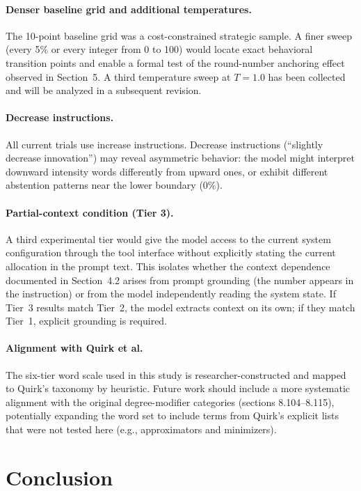 \documentclass[11pt]{article}
\begin{document}
\paragraph{Denser baseline grid and additional temperatures.}
The 10-point baseline grid was a cost-constrained strategic sample. A finer sweep (every 5\% or every integer from 0 to 100) would locate exact behavioral transition points and enable a formal test of the round-number anchoring effect observed in Section~5. A third temperature sweep at $T{=}1.0$ has been collected and will be analyzed in a subsequent revision.

\paragraph{Decrease instructions.}
All current trials use increase instructions. Decrease instructions (``slightly decrease innovation'') may reveal asymmetric behavior: the model might interpret downward intensity words differently from upward ones, or exhibit different abstention patterns near the lower boundary (0\%).

\paragraph{Partial-context condition (Tier 3).}
A third experimental tier would give the model access to the current system configuration through the tool interface without explicitly stating the current allocation in the prompt text. This isolates whether the context dependence documented in Section~4.2 arises from prompt grounding (the number appears in the instruction) or from the model independently reading the system state. If Tier~3 results match Tier~2, the model extracts context on its own; if they match Tier~1, explicit grounding is required.

\paragraph{Alignment with Quirk et al.}
The six-tier word scale used in this study is researcher-constructed and mapped to Quirk's taxonomy by heuristic. Future work should include a more systematic alignment with the original degree-modifier categories (sections 8.104--8.115), potentially expanding the word set to include terms from Quirk's explicit lists that were not tested here (e.g., approximators and minimizers).

\section{Conclusion}
\end{document}
